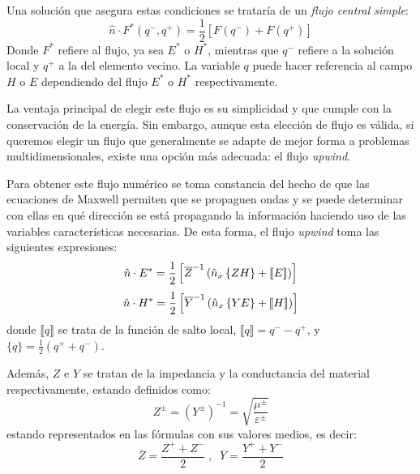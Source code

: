 \documentclass[11pt,a4paper,twoside,pdf]{article}
\numberwithin{equation}{section}
\begin{document}
Una solución que asegura estas condiciones se trataría de un \textit{flujo central simple}:
\begin{equation}
    \hat{n}\cdot F^*(q^-,q^+)=\frac{1}{2}\left[F(q^-)+F(q^+)\right]
\end{equation}
Donde $F^*$ refiere al flujo, ya sea $E^*$ o $H^*$, mientras que $q^-$ refiere a la solución local y $q^+$ a la del elemento vecino. La variable $q$ puede hacer referencia al campo $H$ o $E$ dependiendo del flujo $E^*$ o $H^*$ respectivamente.

La ventaja principal de elegir este flujo es su simplicidad y que cumple con la conservación de la energía. Sin embargo, aunque esta elección de flujo es válida, si queremos elegir un flujo que generalmente se adapte de mejor forma a problemas multidimensionales, existe una opción más adecuada: el flujo  \textit{upwind}. 

Para obtener este flujo numérico se toma constancia del hecho de que las ecuaciones de Maxwell permiten que se propaguen ondas y se puede determinar con ellas en qué dirección se está propagando la información haciendo uso de las variables características necesarias. De esta forma, el flujo \textit{upwind} toma las siguientes expresiones:
\begin{equation}
    \hat{n}\cdot E^*=\frac{1}{2}\left[\overline{Z}^{-1}\left(\hat{n}_x\left\{ZH\right\}+\llbracket E \rrbracket\right) \right] \notag
\end{equation}
\begin{equation}
    \hat{n}\cdot H^*=\frac{1}{2}\left[\overline{Y}^{-1}\left(\hat{n}_x\left\{YE\right\}+\llbracket H \rrbracket\right) \right] \notag
\end{equation}
donde $\llbracket q \rrbracket$ se trata de la función de salto local, $\llbracket q \rrbracket=q^--q^+$, y $\{q\}=\frac{1}{2}(q^++q^-)$.

Además, $Z$ e $Y$ se tratan de la impedancia y la conductancia del material respectivamente, estando definidos como:
\begin{equation}
    Z^\pm=(Y^\pm)^{-1}=\sqrt{\frac{\mu^\pm}{\varepsilon^\pm}}
\end{equation}
estando representados en las fórmulas con sus valores medios, es decir:
\begin{equation}
    \overline{Z}=\frac{Z^++Z^-}{2}\;, \;\;\overline{Y}=\frac{Y^++Y^-}{2}
\end{equation}
\begin{comment}

\begin{equation}
    \int^{x^k_+}_{x^k_-}\left(\mu\frac{\partial H}{\partial t}l_i^k(x)-\hat{n}\cdot E \frac{dl_i^k(x)}{dx}\right)dx=-\oint^{x^k_+}_{x^k_-}l_i^k(x)\;\hat{n}\cdot E\;dx
\end{equation}
    
\end{comment}
\end{document}
